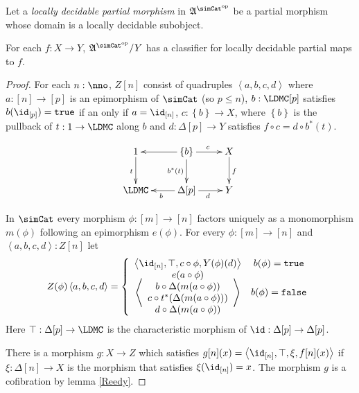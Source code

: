 \documentclass{tac}
\newcommand\hide[1]{}
\newcommand\set[1]{\left\{#1\right\}}
\newcommand\ri{^*}
\newcommand\dual{^{\mathrm{op}}}
\newcommand\s{^{\simCat\dual}}
\newcommand\of{:}
\newcommand\simplex\Delta
\newcommand\tuplet[1]{\left\langle #1 \right\rangle}
\newcommand\true{\mathtt{true}}
\newcommand\false{\mathtt{false}}
\newcommand\ambient{\mathfrak A}
\begin{document}
\begin{definition} Let a \emph{locally decidable partial morphism} in $\ambient\s$ be a partial morphism whose domain is a locally decidable subobject.
\end{definition}

\begin{lemma} For each $f\of X\to Y$, $\ambient\s/Y$ has a classifier for locally decidable partial maps to $f$.\label{generic cofibrations} \end{lemma}

\hide{ Contractible reflection given by the locally decidable partial map generator. }%
\begin{proof}
For each $n\of\nno$, $Z[n]$ consist of quadruples $\tuplet{a,b,c,d}$ where 
 $a\of[n]\to [p]$ is an epimorphism of $\simCat$ (so $p\leq n$), 
 $b\of \LDMC[p]$ satisfies $b(\id_{[p]})=\true$ if an only if $a=\id_{[n]}$,%
 $c\of \set{b}\to X$, where $\set{b}$ is the pullback of $t\of 1\to\LDMC$ along $b$ and 
 $d\of \simplex[p]\to Y$ satisfies $f\circ c = d\circ b\ri(t)$.

\[\xymatrix{
1\ar[d]_t & \set b\ar[l]\ar[d]_{b\ri(t)}\ar[r]^{c} & X\ar[d]^f \\
\LDMC & \simplex[p]\ar[l]^b\ar[r]_d & Y
}\]

In $\simCat$ every morphism $\phi\of [m]\to[n]$ factors uniquely as a monomorphism $m(\phi)$ following an epimorphism $e(\phi)$. For every $\phi\of [m]\to [n]$ and $\tuplet{a,b,c,d}\of Z[n]$ let
\[ Z(\phi)\tuplet{a,b,c,d} = \left\{\begin{array}{cc}
\tuplet{\id_{[n]},\top,c\circ\phi,Y(\phi)(d)} & b(\phi)=\true \\
\tuplet{\begin{array}{c} e(a\circ \phi)\\ b\circ \simplex(m(a\circ \phi))\\ c \circ t\ri(\simplex(m(a\circ \phi)))\\ d\circ\simplex(m(a\circ \phi))\end{array}} & b(\phi)=\false
\end{array}\right.
\]
Here $\top\of \simplex[p]\to\LDMC$ is the characteristic morphism of $\id\of\simplex[p]\to\simplex[p]$.

There is a morphism $g\of X\to Z$ which satisfies $g[n](x) = \tuplet{\id_{[n]},\top,\xi,f[n](x)}$ if $\xi\of\simplex[n] \to X$ is the morphism that satisfies $\xi(\id_{[n]})=x$. The morphism $g$ is a cofibration by lemma \ref{Reedy}.


\end{proof}
\end{document}
